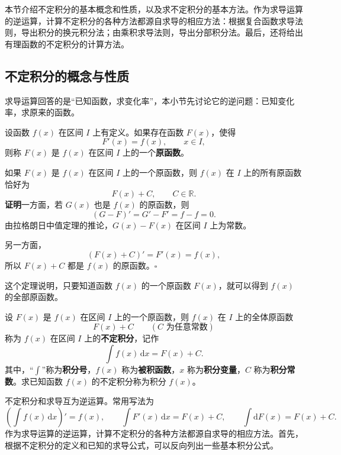 \documentclass[fontset=fandol]{ctexart}
\newcommand{\dd}{\mathrm{d}}
\newcommand{\RR}{\mathbb{R}}
\begin{document}
本节介绍不定积分的基本概念和性质，以及求不定积分的基本方法。作为求导运算的逆运算，计算不定积分的各种方法都源自求导的相应方法：根据复合函数求导法则，导出积分的换元积分法；由乘积求导法则，导出分部积分法。最后，还将给出有理函数的不定积分的计算方法。

\subsection{不定积分的概念与性质}

求导运算回答的是“已知函数，求变化率”，本小节先讨论它的逆问题：已知变化率，求原来的函数。

\begin{definition}[原函数]
设函数 $f(x)$ 在区间 $I$ 上有定义。如果存在函数 $F(x)$，使得
\[
F'(x)=f(x),\qquad x\in I,
\]
则称 $F(x)$ 是 $f(x)$ 在区间 $I$ 上的一个\textbf{原函数}。
\end{definition}

\begin{theorem}[原函数族]
如果 $F(x)$ 是 $f(x)$ 在区间 $I$ 上的一个原函数，则 $f(x)$ 在 $I$ 上的所有原函数恰好为
\[
F(x)+C,\qquad C\in\RR.
\]
\textbf{证明}\quad 一方面，若 $G(x)$ 也是 $f(x)$ 的原函数，则
\[
(G-F)'=G'-F'=f-f=0.
\]
由拉格朗日中值定理的推论，$G(x)-F(x)$ 在区间 $I$ 上为常数。

另一方面，
\[
(F(x)+C)'=F'(x)=f(x),
\]
所以 $F(x)+C$ 都是 $f(x)$ 的原函数。\hfill$\square$
\end{theorem}

这个定理说明，只要知道函数 $f(x)$ 的一个原函数 $F(x)$，就可以得到 $f(x)$ 的全部原函数。

\begin{definition}[不定积分]
设 $F(x)$ 是 $f(x)$ 在区间 $I$ 上的一个原函数，则 $f(x)$ 在 $I$ 上的全体原函数
\[
F(x)+C\qquad(C\text{ 为任意常数})
\]
称为 $f(x)$ 在区间 $I$ 上的\textbf{不定积分}，记作
\[
\int f(x)\,\dd x=F(x)+C.
\]
其中，“$\int$”称为\textbf{积分号}，$f(x)$ 称为\textbf{被积函数}，$x$ 称为\textbf{积分变量}，$C$ 称为\textbf{积分常数}。求已知函数 $f(x)$ 的不定积分称为积分 $f(x)$。
\end{definition}

不定积分和求导互为逆运算。常用写法为
\[
\left(\int f(x)\,\dd x\right)'=f(x),\qquad
\int F'(x)\,\dd x=F(x)+C,\qquad
\int \dd F(x)=F(x)+C.
\]
作为求导运算的逆运算，计算不定积分的各种方法都源自求导的相应方法。首先，根据不定积分的定义和已知的求导公式，可以反向列出一些基本积分公式。
\end{document}
